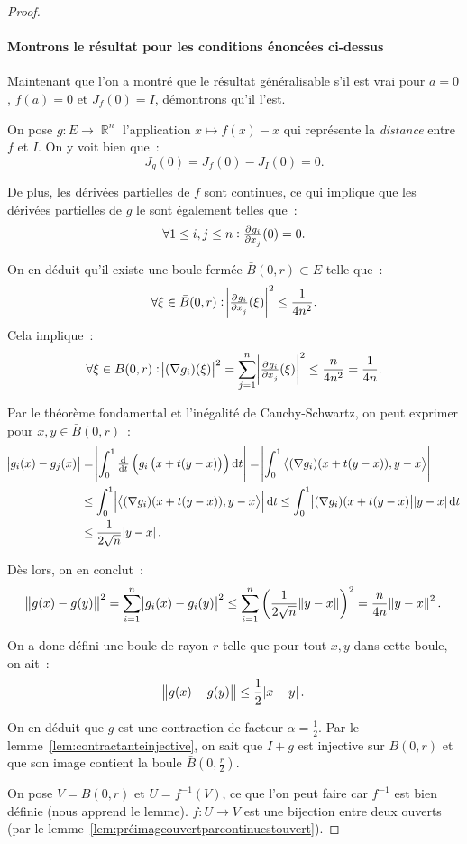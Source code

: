 \documentclass{article}
\DeclareMathOperator{\R}{\mathbb R}
\newcommand{\scpr}[2]{{\left\langle#1, #2\right\rangle}}
\theoremstyle{definition}
\theoremstyle{remark}
\begin{document}
\begin{proof}
		\paragraph{Montrons le résultat pour les conditions énoncées ci-dessus} Maintenant que l'on a montré que le résultat généralisable s'il est vrai pour
		$a=0$, $f(a)=0$ et $J_f(0) = I$, démontrons qu'il l'est.

		On pose $g : E \to \R^n$ l'application $x \mapsto f(x) - x$ qui représente la \emph{distance} entre $f$ et $I$. On y voit bien que~:
		\[J_g(0) = J_f(0) - J_I(0) = 0.\]

		De plus, les dérivées partielles de $f$ sont continues, ce qui implique que les dérivées partielles de $g$ le sont également telles que~:
		\[\forall 1 \leq i, j \leq n : \pd {g_i}{x_j}(0) = 0.\]

		On en déduit qu'il existe une boule fermée $\bar B(0, r) \subset E$ telle que~:
		\[\forall \xi \in \bar B(0, r) : \abs{\pd {g_i}{x_j}(\xi)}^2 \leq \frac 1{4n^2}.\]
		Cela implique~:
		\[\forall \xi \in \bar B(0, r) : \abs{(\nabla g_i)(\xi)}^2 = \sum_{j=1}^n\abs{\pd {g_i}{x_j}(\xi)}^2 \leq \frac n{4n^2} = \frac 1{4n}.\]

		Par le théorème fondamental et l'inégalité de Cauchy-Schwartz, on peut exprimer pour $x, y \in \bar B(0, r)$~:
		\begin{align*}
			\abs{g_i(x) - g_j(x)} &= \abs{\int_0^1\od {}t\left(g_i\left(x + t(y-x)\right)\right)\dif t} = \abs{\int_0^1\scpr {(\nabla g_i)(x + t(y-x))}{y-x}} \\
			&\leq \int_0^1\abs{\scpr {(\nabla g_i)(x + t(y-x))}{y-x}}\dif t \leq \int_0^1\abs{(\nabla g_i)(x+t(y-x)}\abs{y-x}\dif t \\
			&\leq \frac 1{2\sqrt n}\abs{y-x}.
		\end{align*}

		Dès lors, on en conclut~:
		\[\norm {g(x)-g(y)}^2 = \sum_{i=1}^n\abs{g_i(x)-g_i(y)}^2 \leq \sum_{i=1}^n\left(\frac 1{2\sqrt n}\norm{y-x}\right)^2 = \frac n{4n}\norm{y-x}^2.\]

		On a donc défini une boule de rayon $r$ telle que pour tout $x, y$ dans cette boule, on ait~:
		\[\norm{g(x)-g(y)} \leq \frac 12\abs{x-y}.\]

		On en déduit que $g$ est une contraction de facteur $\alpha = \frac 12$. Par le lemme~\ref{lem:contractanteinjective}, on sait que $I+g$ est injective
		sur $\bar B(0, r)$ et que son image contient la boule $\bar B\left(0, \frac r2\right)$.

		On pose $V = B(0, r)$ et $U = f^{-1}(V)$, ce que l'on peut faire car $f^{-1}$ est bien définie (nous apprend le lemme). $f : U \to V$ est une bijection
		entre deux ouverts (par le lemme~\ref{lem:préimageouvertparcontinuestouvert}).


\end{proof}
\end{document}
